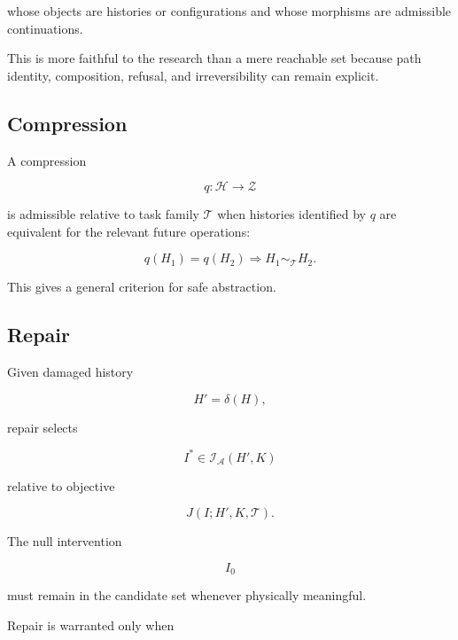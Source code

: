 \documentclass[11pt]{article}
\theoremstyle{remark}
\newcommand{\Adm}{\mathcal{A}}
\begin{document}
whose objects are histories or configurations and whose morphisms are admissible continuations.

This is more faithful to the research than a mere reachable set because path identity, composition, refusal, and irreversibility can remain explicit.

\subsection{Compression}

A compression

\begin{equation}
q:\mathcal{H}\rightarrow\mathcal{Z}
\end{equation}

is admissible relative to task family $\mathcal{T}$ when histories identified by $q$ are equivalent for the relevant future operations:

\begin{equation}
q(H_1)=q(H_2)
\Rightarrow
H_1\sim_{\mathcal{T}}H_2.
\end{equation}

This gives a general criterion for safe abstraction.

\subsection{Repair}

Given damaged history

\begin{equation}
H'
=
\delta(H),
\end{equation}

repair selects

\begin{equation}
I^\ast
\in
\mathcal{I}_{\Adm}(H',K)
\end{equation}

relative to objective

\begin{equation}
J
(
I;
H',
K,
\mathcal{T}
).
\end{equation}

The null intervention

\begin{equation}
I_0
\end{equation}

must remain in the candidate set whenever physically meaningful.

Repair is warranted only when
\end{document}
